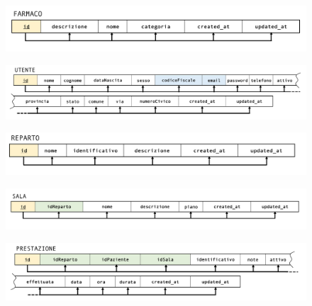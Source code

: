 \documentclass[paper=a4, fontsize=11pt,x11names]{report}
\begin{document}
\begin{figure}
\begin{center}
\includegraphics[scale=0.35]{immagini_normalizzazione/farmaco}
\end{center}
\end{figure}

\begin{figure}[H]
\begin{center}
\includegraphics[scale=0.25]{immagini_normalizzazione/utente}
\end{center}
\end{figure}

\begin{figure}[H]
\begin{center}
\includegraphics[scale=0.38]{immagini_normalizzazione/reparto}
\end{center}
\end{figure}

\begin{figure}[H]
\begin{center}
\includegraphics[scale=0.30]{immagini_normalizzazione/sala}
\end{center}
\end{figure}

\begin{figure}[H]
\begin{center}
\includegraphics[scale=0.25]{immagini_normalizzazione/prestazione}
\end{center}
\end{figure}
\end{document}
